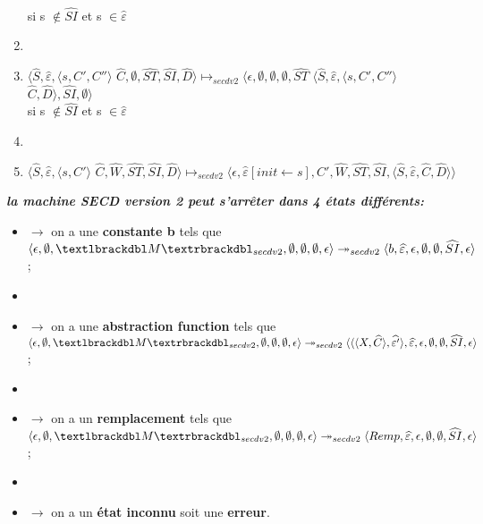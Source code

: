 \documentclass[10pt,a4paper]{article}
\begin{document}
\begin{enumerate}
					\\si s $\notin \widehat{SI}$ et s $\in \widehat{\varepsilon}$ 
					\item[]
					\item $\langle\widehat{S},\widehat{\varepsilon},\langle s, C',C''\rangle$ $\widehat{C},\emptyset,\widehat{ST},\widehat{SI},\widehat{D}\rangle \longmapsto_{secdv2} \langle\epsilon,\emptyset,\emptyset,\emptyset,\widehat{ST}$ $\langle\widehat{S},\widehat{\varepsilon},\langle s, C',C''\rangle$ $\widehat{C},\widehat{D}\rangle,\widehat{SI},\emptyset\rangle$ 
					\\si s $\notin \widehat{SI}$ et s $\in \widehat{\varepsilon}$ 
					\item[]
					\item $\langle\widehat{S},\widehat{\varepsilon},\langle s, C'\rangle$ $\widehat{C},\widehat{W},\widehat{ST},\widehat{SI},\widehat{D}\rangle \longmapsto_{secdv2} \langle\epsilon,\widehat{\varepsilon}[init \leftarrow s],C',\widehat{W},\widehat{ST},\widehat{SI},\langle\widehat{S},\widehat{\varepsilon},\widehat{C},\widehat{D}\rangle\rangle$
				\end{enumerate}
				\bigbreak
				\bigbreak
				
				\textbf{\textit{la machine SECD version 2 peut s'arrêter dans 4 états différents:}}
				\smallbreak
				\begin{itemize}
					\item[]$\longrightarrow$ on a une \textbf{constante b} tels que $\langle \epsilon,\emptyset,\textlbrackdbl M\textrbrackdbl_{secdv2},\emptyset,\emptyset,\emptyset,\epsilon\rangle \twoheadrightarrow_{secdv2} \langle b,\widehat{\varepsilon},\epsilon,\emptyset,\emptyset,\widehat{SI},\epsilon\rangle$;
					\item[] 
					\item[]$\longrightarrow$ on a une \textbf{abstraction function} tels que $\langle \epsilon,\emptyset,\textlbrackdbl M\textrbrackdbl_{secdv2},\emptyset,\emptyset,\emptyset,\epsilon\rangle \twoheadrightarrow_{secdv2} \langle\langle\langle X,\widehat{C}\rangle,\widehat{\varepsilon'}\rangle,\widehat{\varepsilon},\epsilon,\emptyset,\emptyset,\widehat{SI},\epsilon\rangle$;
					\item[] 
					\item[]$\longrightarrow$ on a un \textbf{remplacement} tels que $\langle \epsilon,\emptyset,\textlbrackdbl M\textrbrackdbl_{secdv2},\emptyset,\emptyset,\emptyset,\epsilon\rangle \twoheadrightarrow_{secdv2} \langle Remp,\widehat{\varepsilon},\epsilon,\emptyset,\emptyset,\widehat{SI},\epsilon\rangle$;
					\item[]
					\item[]$\longrightarrow$ on a un \textbf{état inconnu} soit une \textbf{erreur}.
				\end{itemize}
				\newpage
				
\end{document}
